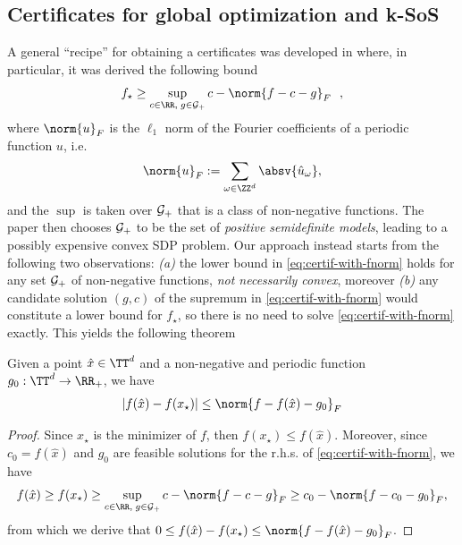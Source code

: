\documentclass{article}
\begin{document}
\subsection{Certificates for global optimization and k-SoS}
A general ``recipe'' for obtaining a certificates was developed in \cite{woodworthNonConvexOptimizationCertificates2022}
where, in particular, it was  derived the following bound \citep[see Thm. 2]{woodworthNonConvexOptimizationCertificates2022}
\begin{equation}\label{eq:certif-with-fnorm}
  f_\star \geq \sup_{c \in \RR, \; g \in {\cal G}_+} c - \norm{f - c - g}_F ~~ ,
\end{equation}
where $\norm{u}_F$ is the $\ell_1$ norm of the Fourier coefficients of a periodic function $u$, i.e.
\begin{equation}\label{eq:def-fnorm}
  \norm{u}_F := \sum_{\omega \in \ZZ^d} \absv{\hat{u}_\omega},
\end{equation}
and the $\sup$ is taken over ${\cal G}_+$ that is a class of non-negative functions. The paper \cite{woodworthNonConvexOptimizationCertificates2022} then chooses ${\cal G}_+$ to be the set of \emph{positive semidefinite models}, leading to a possibly expensive convex SDP problem. Our approach instead starts from the following two observations: \emph{(a)} the lower bound in \cref{eq:certif-with-fnorm} holds for any set ${\cal G}_+$ of non-negative functions, \emph{not necessarily convex}, moreover \emph{(b)} any candidate solution $(g, c)$ of the supremum in \cref{eq:certif-with-fnorm} would constitute a lower bound for $f_\star$, so there is no need to solve \cref{eq:certif-with-fnorm} exactly. This yields the following theorem

\begin{theorem}\label{thm:certificate}
  Given a point $\hat{x} \in \TT^d$ and a non-negative and periodic function $g_0: \TT^d \to \RR_+$, we have
  \begin{equation}
    |f(\hat{x}) - f(x_\star)| \leq \norm{f - f(\hat{x}) - g_0}_F
  \end{equation}
\end{theorem}
\begin{proof}
  Since $x_\star$ is the minimizer of $f$, then $f(x_\star) \leq f(\hat{x})$. Moreover, since $c_0 = f(\hat{x})$ and $g_0$ are feasible solutions for the r.h.s. of  \cref{eq:certif-with-fnorm}, we have
  \begin{equation*}
    f(\hat{x}) \geq f(x_\star) \geq \sup_{c \in \RR, \; g \in {\cal G}_+} c - \norm{f - c - g}_F  \geq  c_0 - \norm{f - c_0 - g_0}_F,
  \end{equation*}
  from which we derive that  $0 \leq f(\hat{x}) - f(x_\star) \leq \norm{f - f(\hat{x}) - g_0}_F$.
\end{proof}
\end{document}
